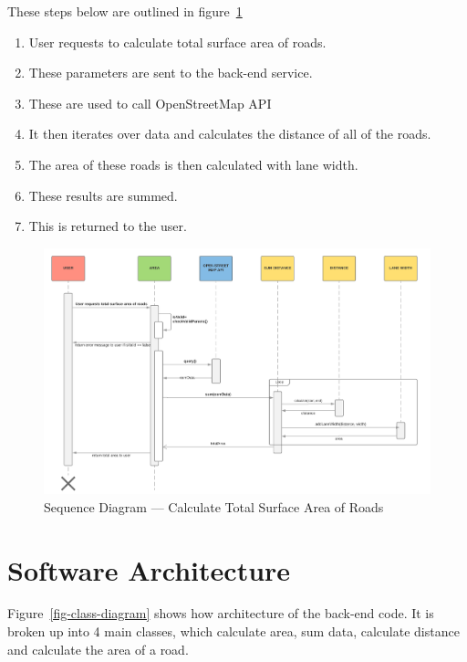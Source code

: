 \documentclass[a4paper,11pt]{article}
\begin{document}
These steps below are outlined in figure~\ref{fig:seq-total-area-roads}

\begin{enumerate}
  \item User requests to calculate total surface area of roads.
  \item These parameters are sent to the back-end service.
  \item These are used to call OpenStreetMap API
  \item It then iterates over data and calculates the distance of all of the
    roads.
  \item The area of these roads is then calculated with lane width.
  \item These results are summed.
  \item This is returned to the user.
\end{enumerate}

\begin{figure}[H]
  \includegraphics[width=\textwidth]{sequence-diagram-calculate-total-surface-area-of-roads}
  \caption{Sequence Diagram --- Calculate Total Surface Area of
  Roads}\label{fig:seq-total-area-roads}
\end{figure}

\section{Software Architecture}

Figure~\ref{fig-class-diagram} shows how architecture of the back-end code. It
is broken up into 4 main classes, which calculate area, sum data, calculate
distance and calculate the area of a road.
\end{document}

